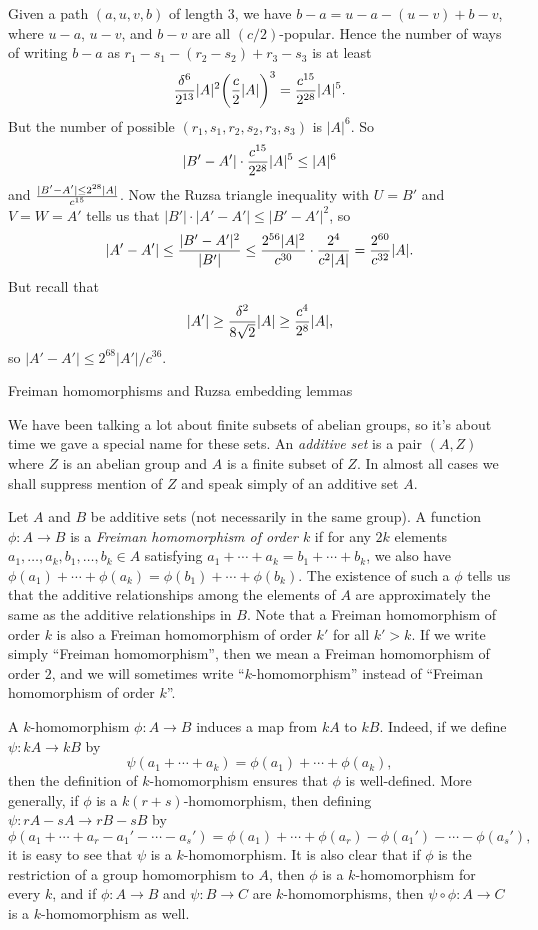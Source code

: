 Given a path $(a,u,v,b)$ of length $3$, we have $b-a = u-a - (u-v) + b-v$, where $u-a$, $u-v$, and $b-v$
are all $(c/2)$-popular. Hence the number of ways of writing $b-a$ as $r_1-s_1 - (r_2-s_2) + r_3 - s_3$
is at least
$${\delta^6\over 2^{13}} |A|^2 \biggl( {c\over 2} |A|\biggr)^3 = {c^{15}\over 2^{28}} |A|^5.$$
But the number of possible $(r_1,s_1,r_2,s_2,r_3,s_3)$ is $|A|^6$. So
$$ |B'-A'|\cdot {c^{15}\over 2^{28}} |A|^5 \le |A|^6 $$
and $|B'-A'|\le 2^{28}|A|\over c^{15}$. Now the Ruzsa triangle inequality with $U = B'$ and
$V = W = A'$ tells us that $|B'|\cdot |A'-A'| \le |B'-A'|^2$, so
$$|A'-A'|\le {|B'-A'|^2\over |B'|} \le {2^{56}|A|^2\over c^{30}}\cdot {2^4\over c^2|A|}={2^{60}\over c^{32}}|A|.$$
But recall that
$$|A'| \ge {\delta^2\over 8\sqrt 2} |A| \ge {c^4\over 2^8}|A|,$$
so $|A'-A'| \le 2^{68}|A'|/c^{36}$.\slug

\advsect Freiman homomorphisms and Ruzsa embedding lemmas

We have been talking a lot about finite subsets of abelian groups, so it's about time we gave
a special name for these sets. An {\it additive set} is a pair $(A,Z)$ where $Z$ is an abelian
group and $A$ is a finite subset of $Z$. In almost all cases we shall suppress mention of $Z$
and speak simply of an additive set $A$.

Let $A$ and $B$ be additive sets (not necessarily in the same group). A function $\phi:A\to B$
is a {\it Freiman homomorphism of order $k$} if for any $2k$ elements $a_1,\ldots,a_k,b_1,\ldots,b_k\in A$
satisfying
$a_1+\cdots +a_k = b_1+\cdots+b_k$, we also have $\phi(a_1)+\cdots+\phi(a_k) =\phi(b_1)+\cdots+\phi(b_k)$.
The existence of such a $\phi$ tells us that the additive relationships among
the elements of $A$ are approximately the same as the additive relationships in $B$. Note that a Freiman
homomorphism of order $k$ is also a Freiman homomorphism of order $k'$ for all $k'>k$.
If we write simply ``Freiman
homomorphism'', then we mean a Freiman homomorphism of order $2$, and we will sometimes write ``$k$-homomorphism''
instead of ``Freiman homomorphism of order $k$''.

A $k$-homomorphism $\phi:A\to B$ induces a map from $kA$ to $kB$. Indeed, if we define $\psi: kA\to kB$
by
$$\psi(a_1+\cdots+a_k) = \phi(a_1) + \cdots + \phi(a_k),$$
then the definition of $k$-homomorphism ensures that $\phi$ is well-defined. More generally, if $\phi$
is a $k(r+s)$-homomorphism, then defining $\psi : rA-sA \to rB-sB$ by
$$\phi(a_1+\cdots+a_r-a_1'-\cdots-a_s') = \phi(a_1)+\cdots+\phi(a_r) -\phi(a_1')-\cdots-\phi(a_s'),$$
it is easy to see that $\psi$ is a $k$-homomorphism. It is also clear that if $\phi$ is the
restriction of a group homomorphism to $A$, then $\phi$ is a $k$-homomorphism for every $k$, and
if $\phi:A\to B$ and $\psi:B\to C$ are $k$-homomorphisms, then $\psi\circ \phi : A\to C$ is a $k$-homomorphism
as well.

